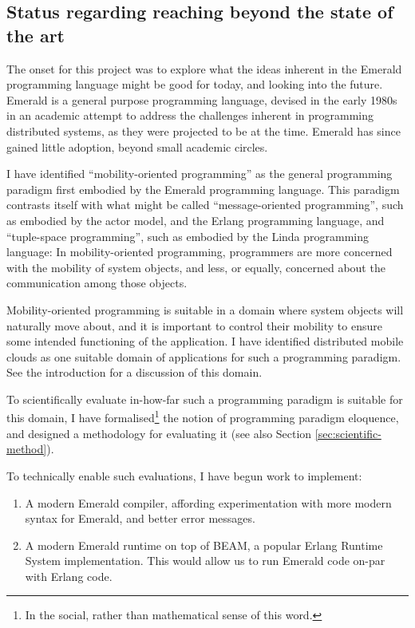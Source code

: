 \subsection{Status regarding reaching beyond the state of the art}

The onset for this project was to explore what the ideas inherent in
the Emerald programming language\cite{emerald:tocs:1988,
emerald:tse:1987, emerald:spe:1991} might be good for today, and
looking into the future. Emerald is a general purpose programming
language, devised in the early 1980s in an academic attempt to address
the challenges inherent in programming distributed systems, as they
were projected to be at the time. Emerald has since gained little
adoption, beyond small academic circles.

I have identified ``mobility-oriented programming'' as the general
programming paradigm first embodied by the Emerald programming
language. This paradigm contrasts itself with what might be called
``message-oriented programming'', such as embodied by the actor
model\cite{1973-Actors, 2016-43-Years-of-Actors}, and the Erlang
programming language\cite{2003-PhD-Armstrong}, and ``tuple-space
programming'', such as embodied by the Linda programming
language\cite{1984-Linda-and-Friends}: In mobility-oriented
programming, programmers are more concerned with the mobility of
system objects, and less, or equally, concerned about the
communication among those objects.

Mobility-oriented programming is suitable in a domain where system
objects will naturally move about, and it is important to control
their mobility to ensure some intended functioning of the application.
I have identified distributed mobile clouds as one suitable domain
of applications for such a programming paradigm. See the introduction
for a discussion of this domain.

To scientifically evaluate in-how-far such a programming paradigm is
suitable for this domain, I have formalised\footnote{In the social,
rather than mathematical sense of this word.} the notion of
programming paradigm eloquence, and designed a methodology for
evaluating it (see also Section \ref{sec:scientific-method}).

To technically enable such evaluations, I have begun work to
implement:

\begin{enumerate}

\item A modern Emerald compiler, affording experimentation with more
modern syntax for Emerald, and better error messages.

\item A modern Emerald runtime on top of BEAM, a popular Erlang
Runtime System implementation. This would allow us to run Emerald code
on-par with Erlang code.

\end{enumerate}

